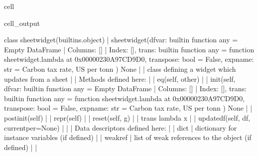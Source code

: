 \documentclass[letterpaper,10pt,english]{jupyterBook}
\begin{document}
\begin{sphinxuseclass}{cell}
\begin{sphinxVerbatimOutput}
\begin{sphinxuseclass}{cell_output}
\begin{sphinxVerbatim}[commandchars=\\\{\}]
    class sheetwidget(builtins.object)
     |  sheetwidget(df\PYGZus{}var: \PYGZlt{}built\PYGZhy{}in function any\PYGZgt{} = Empty DataFrame
     |  Columns: []
     |  Index: [], trans: \PYGZlt{}built\PYGZhy{}in function any\PYGZgt{} = \PYGZlt{}function sheetwidget.\PYGZlt{}lambda\PYGZgt{} at 0x00000230A97CD9D0\PYGZgt{}, transpose: bool = False, expname: str = \PYGZsq{}Carbon tax rate, US\PYGZdl{} per tonn \PYGZsq{}) \PYGZhy{}\PYGZgt{} None
     |  
     |  class defining a widget which updates from a sheet
     |  
     |  Methods defined here:
     |  
     |  \PYGZus{}\PYGZus{}eq\PYGZus{}\PYGZus{}(self, other)
     |  
     |  \PYGZus{}\PYGZus{}init\PYGZus{}\PYGZus{}(self, df\PYGZus{}var: \PYGZlt{}built\PYGZhy{}in function any\PYGZgt{} = Empty DataFrame
     |  Columns: []
     |  Index: [], trans: \PYGZlt{}built\PYGZhy{}in function any\PYGZgt{} = \PYGZlt{}function sheetwidget.\PYGZlt{}lambda\PYGZgt{} at 0x00000230A97CD9D0\PYGZgt{}, transpose: bool = False, expname: str = \PYGZsq{}Carbon tax rate, US\PYGZdl{} per tonn \PYGZsq{}) \PYGZhy{}\PYGZgt{} None
     |  
     |  \PYGZus{}\PYGZus{}post\PYGZus{}init\PYGZus{}\PYGZus{}(self)
     |  
     |  \PYGZus{}\PYGZus{}repr\PYGZus{}\PYGZus{}(self)
     |  
     |  reset(self, g)
     |  
     |  trans lambda x
     |  
     |  update\PYGZus{}df(self, df, current\PYGZus{}per=None)
     |  
     |  \PYGZhy{}\PYGZhy{}\PYGZhy{}\PYGZhy{}\PYGZhy{}\PYGZhy{}\PYGZhy{}\PYGZhy{}\PYGZhy{}\PYGZhy{}\PYGZhy{}\PYGZhy{}\PYGZhy{}\PYGZhy{}\PYGZhy{}\PYGZhy{}\PYGZhy{}\PYGZhy{}\PYGZhy{}\PYGZhy{}\PYGZhy{}\PYGZhy{}\PYGZhy{}\PYGZhy{}\PYGZhy{}\PYGZhy{}\PYGZhy{}\PYGZhy{}\PYGZhy{}\PYGZhy{}\PYGZhy{}\PYGZhy{}\PYGZhy{}\PYGZhy{}\PYGZhy{}\PYGZhy{}\PYGZhy{}\PYGZhy{}\PYGZhy{}\PYGZhy{}\PYGZhy{}\PYGZhy{}\PYGZhy{}\PYGZhy{}\PYGZhy{}\PYGZhy{}\PYGZhy{}\PYGZhy{}\PYGZhy{}\PYGZhy{}\PYGZhy{}\PYGZhy{}\PYGZhy{}\PYGZhy{}\PYGZhy{}\PYGZhy{}\PYGZhy{}\PYGZhy{}\PYGZhy{}\PYGZhy{}\PYGZhy{}\PYGZhy{}\PYGZhy{}\PYGZhy{}\PYGZhy{}\PYGZhy{}\PYGZhy{}\PYGZhy{}\PYGZhy{}\PYGZhy{}
     |  Data descriptors defined here:
     |  
     |  \PYGZus{}\PYGZus{}dict\PYGZus{}\PYGZus{}
     |      dictionary for instance variables (if defined)
     |  
     |  \PYGZus{}\PYGZus{}weakref\PYGZus{}\PYGZus{}
     |      list of weak references to the object (if defined)
     |  
     |  \PYGZhy{}\PYGZhy{}\PYGZhy{}\PYGZhy{}\PYGZhy{}\PYGZhy{}\PYGZhy{}\PYGZhy{}\PYGZhy{}\PYGZhy{}\PYGZhy{}\PYGZhy{}\PYGZhy{}\PYGZhy{}\PYGZhy{}\PYGZhy{}\PYGZhy{}\PYGZhy{}\PYGZhy{}\PYGZhy{}\PYGZhy{}\PYGZhy{}\PYGZhy{}\PYGZhy{}\PYGZhy{}\PYGZhy{}\PYGZhy{}\PYGZhy{}\PYGZhy{}\PYGZhy{}\PYGZhy{}\PYGZhy{}\PYGZhy{}\PYGZhy{}\PYGZhy{}\PYGZhy{}\PYGZhy{}\PYGZhy{}\PYGZhy{}\PYGZhy{}\PYGZhy{}\PYGZhy{}\PYGZhy{}\PYGZhy{}\PYGZhy{}\PYGZhy{}\PYGZhy{}\PYGZhy{}\PYGZhy{}\PYGZhy{}\PYGZhy{}\PYGZhy{}\PYGZhy{}\PYGZhy{}\PYGZhy{}\PYGZhy{}\PYGZhy{}\PYGZhy{}\PYGZhy{}\PYGZhy{}\PYGZhy{}\PYGZhy{}\PYGZhy{}\PYGZhy{}\PYGZhy{}\PYGZhy{}\PYGZhy{}\PYGZhy{}\PYGZhy{}\PYGZhy{}

\end{sphinxVerbatim}
\end{sphinxuseclass}
\end{sphinxVerbatimOutput}
\end{sphinxuseclass}
\end{document}
